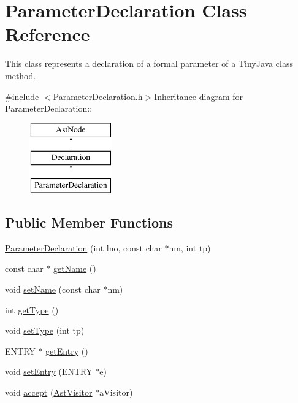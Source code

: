 \hypertarget{classParameterDeclaration}{
\section{ParameterDeclaration Class Reference}
\label{classParameterDeclaration}
}


This class represents a declaration of a formal parameter of a TinyJava class method.  


{\ttfamily \#include $<$ParameterDeclaration.h$>$}Inheritance diagram for ParameterDeclaration::\begin{figure}[H]
\begin{center}
\leavevmode
\includegraphics[height=3cm]{classParameterDeclaration}
\end{center}
\end{figure}
\subsection*{Public Member Functions}
\begin{DoxyCompactItemize}
\item 
\hyperlink{classParameterDeclaration_ac1212fec82bbbcb3d965f6b21ba0f814}{ParameterDeclaration} (int lno, const char $\ast$nm, int tp)
\item 
const char $\ast$ \hyperlink{classParameterDeclaration_ae8b4050a45ff9671d5bc4020ce8a921f}{getName} ()
\item 
void \hyperlink{classParameterDeclaration_a1883647c68399feaffb9531e27b85bb2}{setName} (const char $\ast$nm)
\item 
int \hyperlink{classParameterDeclaration_a68cbaf66b6aa35c05fc30f236321829a}{getType} ()
\item 
void \hyperlink{classParameterDeclaration_aee125114f14e0bcfaa15753d6b1379cf}{setType} (int tp)
\item 
ENTRY $\ast$ \hyperlink{classParameterDeclaration_a80ec2ae28260deaa1925f3de51c620a8}{getEntry} ()
\item 
void \hyperlink{classParameterDeclaration_a8b07142bec67be6eccd2bdf3147fb5a2}{setEntry} (ENTRY $\ast$e)
\item 
void \hyperlink{classParameterDeclaration_a7e9679286d169930445a159abd5e42ad}{accept} (\hyperlink{classAstVisitor}{AstVisitor} $\ast$aVisitor)
\end{DoxyCompactItemize}



